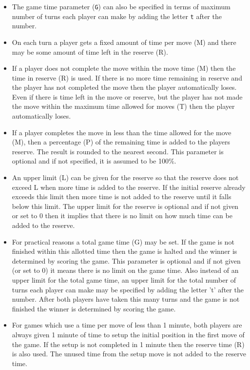 \documentclass[10pt,dvipdfmx,letterpaper]{report}
\begin{document}
\begin{itemize}
\item
The game time parameter ({\tt G}) can also be specified in terms
  of maximum number of turns each player can make by adding
  the letter {\tt t} after the number.
\item
On each turn a player gets a fixed amount of time per 
  move (M) and there may be some amount of time left 
  in the reserve (R).
\item
If a player does not complete the move within the move
  time (M) then the time in reserve (R) is used.  If there is
  no more time remaining in reserve and the player has
  not completed the move then the player automatically loses.
  Even if there is time left in the move or reserve, but the player
  has not made the move within the maximum time allowed
  for moves (T) then the player automatically loses.
\item
If a player completes the move in less than the
  time allowed for the move (M), then a percentage (P) of the 
  remaining time is added to the players reserve.   The 
  result is rounded to the nearest second.  This parameter
  is optional and if not specified, it is assumed to be 100\%.
\item
An upper limit (L) can be given for the reserve so that 
  the reserve does not exceed L when more time is added to 
  the reserve.  If the initial reserve already exceeds this
  limit then more time is not added to the reserve until it
  falls below this limit. The upper limit for the reserve is 
  optional and if not given or set to 0 then it implies that 
  there is no limit on how much time can be added to the reserve.
\item
For practical reasons a total game time (G) may be
  set.  If the game is not finished within this allotted time
  then the game is halted and the winner is determined by 
  scoring the game.  This parameter is optional and if
  not given (or set to 0) it means there is no limit on the 
  game time. Also instead of an upper limit for the total
  game time, an upper limit for the total number of turns each
  player can make may be specified by adding the letter 't'
  after the number. After both players have taken this many 
  turns and the game is not finished the winner is determined 
  by scoring the game.
\item
For games which use a time per move of less than 1 minute,
  both players are always given 1 minute of time to setup the
  initial position in the first move of the game.  If the setup
  is not completed in 1 minute then the reserve time (R) is also used.
  The unused time from the setup move is not added to the
  reserve time.
\end{itemize}
\end{document}
